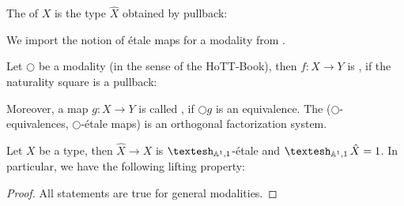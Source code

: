 \begin{definition}
  The  of $X$ is the type $\hat{X}$ obtained by pullback:
  \begin{center}
  \end{center}
\end{definition}

We import the notion of étale maps for a modality from \cite{cherubini_rijke_2021}.

\begin{definition}
  Let $\bigcirc$ be a modality (in the sense of the HoTT-Book),
  then $f:X\to Y$ is , if the naturality square is a pullback:
  \begin{center}
  \end{center}
  Moreover, a map $g:X\to Y$ is called ,
  if $\bigcirc g$ is an equivalence.
  The ($\bigcirc$-equivalences, $\bigcirc$-étale maps) is an orthogonal factorization system. 
\end{definition}

\begin{proposition}
  Let $X$ be a type, then $\hat{X}\to X$ is $\shape_{\A^1,1}$-étale and $\shape_{\A^1,1}\hat{X}=1$.
  In particular, we have the following lifting property:
  \begin{center}
  \end{center}
\end{proposition}

\begin{proof}
  All statements are true for general modalities.
\end{proof}
